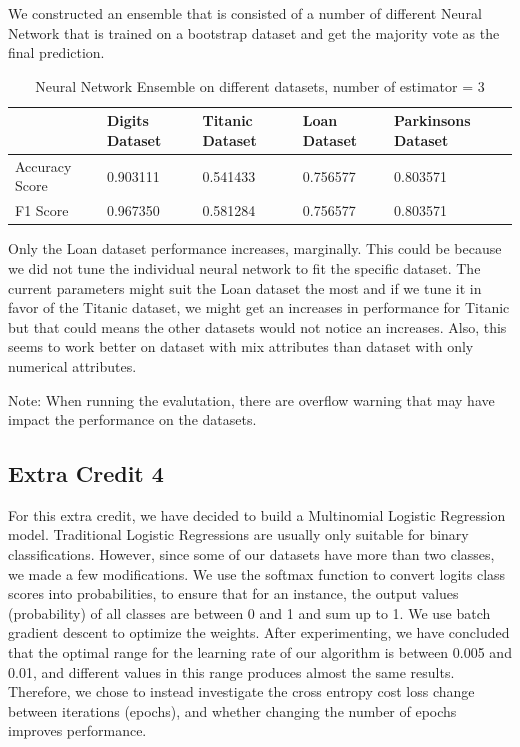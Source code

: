 \documentclass[letterpaper]{article}
\begin{document}
We constructed an ensemble that is consisted of a number of different Neural Network that is trained on a bootstrap dataset and get the majority vote
as the final prediction.

\begin{table}[H]
	\centering
	\begin{tabular}{|l|l|l|l|l|}
		\hline
		               & Digits Dataset & Titanic Dataset & Loan Dataset & Parkinsons Dataset \\ \hline
		Accuracy Score & 0.903111       & 0.541433        & 0.756577     & 0.803571           \\ \hline
		F1 Score       & 0.967350       & 0.581284        & 0.756577     & 0.803571           \\ \hline
	\end{tabular}
	\caption{Neural Network Ensemble on different datasets, number of estimator = 3}
\end{table}

Only the Loan dataset performance increases, marginally. This could be because we did not tune the individual neural network to fit the specific dataset.
The current parameters might suit the Loan dataset the most and if we tune it in favor of the Titanic dataset, we might get an increases in performance
for Titanic but that could means the other datasets would not notice an increases. Also, this seems to work better on dataset with mix attributes than
dataset with only numerical attributes.

Note: When running the evalutation, there are overflow warning that may have impact the performance on the datasets.

\subsection*{Extra Credit 4}

For this extra credit, we have decided to build a Multinomial Logistic Regression model. Traditional Logistic Regressions are usually only suitable for binary classifications.
However, since some of our datasets have more than two classes, we made a few modifications. 
We use the softmax function to convert logits class scores into probabilities, to ensure that for an instance, the output values (probability) of all classes are between 0 and 1 and sum up to 1.
We use batch gradient descent to optimize the weights. After experimenting, we have concluded that the optimal range for the learning rate of our algorithm is between 0.005 and 0.01, and different values in this range produces almost the same results.
Therefore, we chose to instead investigate the cross entropy cost loss change between iterations (epochs), and whether changing the number of epochs improves performance. 
\end{document}
